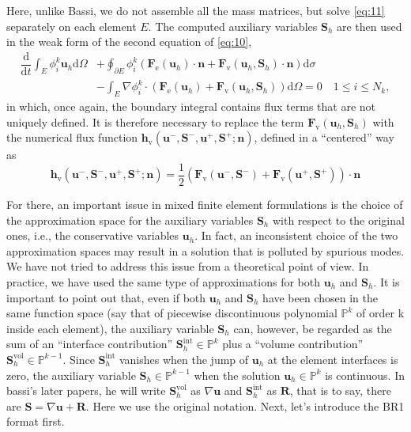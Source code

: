 \documentclass{develop-note}
\begin{document}
Here, unlike Bassi, we do not assemble all the mass matrices, but solve \autoref{eq:11} separately on each element $E$. The computed auxiliary variables $\mathbf{S}_{h}$ are then used in the weak form of the second equation of \autoref{eq:10},
\begin{equation}
  \label{eq:13}
  \begin{aligned}
    \dfrac{\mathrm{d}}{\mathrm{d}t}\int_{E}\phi_{i}^{k}\mathbf{u}_{h}\mathrm{d}\Omega &+\oint_{\partial E}\phi_{i}^{k}(\mathbf{F}_{\mathrm{e}}(\mathbf{u}_{h})\cdot\mathbf{n}+\mathbf{F}_{\mathrm{v}}(\mathbf{u}_{h},\mathbf{S}_{h})\cdot\mathbf{n})\mathrm{d}\sigma\\
    &-\int_{E}\nabla\phi_{i}^{k}\cdot(\mathbf{F}_{\mathrm{e}}(\mathbf{u}_{h})+\mathbf{F}_{\mathrm{v}}(\mathbf{u}_{h},\mathbf{S}_{h}))\mathrm{d}\Omega=0\quad 1\leqslant i\leqslant N_{k},
  \end{aligned}
\end{equation}
in which, once again, the boundary integral contains flux terms that are not uniquely defined. It is therefore necessary to replace the term $\mathbf{F}_{\mathrm{v}}(\mathbf{u}_{h},\mathbf{S}_{h})$ with the numerical flux function $\mathbf{h}_{\mathrm{v}}(\mathbf{u}^{-},\mathbf{S}^{-},\mathbf{u}^{+},\mathbf{S}^{+};\mathbf{n})$, defined in a ``centered'' way as
\begin{equation}
  \mathbf{h}_{\mathrm{v}}(\mathbf{u}^{-},\mathbf{S}^{-},\mathbf{u}^{+},\mathbf{S}^{+};\mathbf{n})=\dfrac{1}{2}(\mathbf{F}_{\mathrm{v}}(\mathbf{u}^{-},\mathbf{S}^{-})+\mathbf{F}_{\mathrm{v}}(\mathbf{u}^{+},\mathbf{S}^{+}))\cdot\mathbf{n}
\end{equation}

For there, an important issue in mixed finite element formulations is the choice of the approximation space for the auxiliary variables $\mathbf{S}_{h}$ with respect to the original ones, i.e., the conservative variables $\mathbf{u}_{h}$. In fact, an inconsistent choice of the two approximation spaces may result in a solution that is polluted by spurious modes. We have not tried to address this issue from a theoretical point of view. In practice, we have used the same type of approximations for both $\mathbf{u}_{h}$ and $\mathbf{S}_{h}$. It is important to point out that, even if both $\mathbf{u}_{h}$ and $\mathbf{S}_{h}$ have been chosen in the same function space (say that of piecewise discontinuous polynomial $\mathbb{P}^{k}$ of order k inside each element), the auxiliary variable $\mathbf{S}_{h}$ can, however, be regarded as the sum of an ``interface contribution'' $\mathbf{S}_{h}^{\mathrm{int}}\in\mathbb{P}^{k}$ plus a ``volume contribution'' $\mathbf{S}_{h}^{\mathrm{vol}}\in\mathbb{P}^{k-1}$. Since $\mathbf{S}_{h}^{\mathrm{int}}$ vanishes when the jump of $\mathbf{u}_{h}$ at the element interfaces is zero, the auxiliary variable $\mathbf{S}_{h}\in\mathbb{P}^{k-1}$ when the solution $\mathbf{u}_{h}\in\mathbb{P}^{k}$ is continuous. In bassi's later papers, he will write $\mathbf{S}_{h}^{\mathrm{vol}}$ as $\nabla\mathbf{u}$ and $\mathbf{S}_{h}^{\mathrm{int}}$ as $\mathbf{R}$, that is to say, there are $\mathbf{S}=\nabla\mathbf{u}+\mathbf{R}$. Here we use the original notation. Next, let's introduce the BR1 format first.
\end{document}
